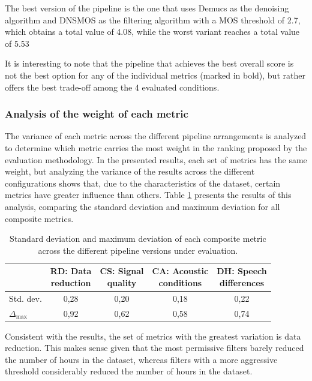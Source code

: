 The best version of the pipeline is the one that uses Demucs as the denoising algorithm and DNSMOS as the filtering algorithm with a MOS threshold of 2.7, which obtains a total value of 4.08, while the worst variant reaches a total value of 5.53

It is interesting to note that the pipeline that achieves the best overall score is not the best option for any of the individual metrics (marked in bold), but rather offers the best trade-off among the 4 evaluated conditions.

\subsubsection{Analysis of the weight of each metric}
The variance of each metric across the different pipeline arrangements is analyzed to determine which metric carries the most weight in the ranking proposed by the evaluation methodology. In the presented results, each set of metrics has the same weight, but analyzing the variance of the results across the different configurations shows that, due to the characteristics of the dataset, certain metrics have greater influence than others. Table \ref{tab:varianza_pipelines} presents the results of this analysis, comparing the standard deviation and maximum deviation for all composite metrics.

\begin{table}[ht]
\centering
\small
\caption{Standard deviation and maximum deviation of each composite metric across the different pipeline versions under evaluation.}
\label{tab:varianza_pipelines}
\begin{tabular}{@{} l c c c c @{}}
\toprule
 & \makecell[c]{\textbf{RD: Data} \\ \textbf{reduction}} &
   \makecell[c]{\textbf{CS: Signal} \\ \textbf{quality}} &
   \makecell[c]{\textbf{CA: Acoustic} \\ \textbf{conditions}} &
   \makecell[c]{\textbf{DH: Speech} \\ \textbf{differences}} \\
\midrule
Std. dev. & 0,28 & 0,20 & 0,18 & 0,22 \\
$\Delta_{\max}$ & 0,92 & 0,62 & 0,58 & 0,74 \\
\bottomrule
\end{tabular}
\end{table}

Consistent with the results, the set of metrics with the greatest variation is data reduction. This makes sense given that the most permissive filters barely reduced the number of hours in the dataset, whereas filters with a more aggressive threshold considerably reduced the number of hours in the dataset.

